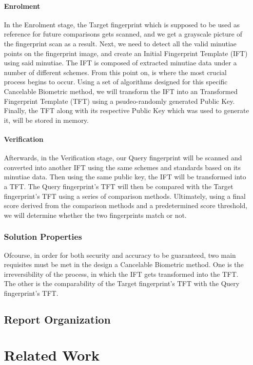 \documentclass[fyp]{socreport}
\begin{document}
\subsubsection{Enrolment}
In the Enrolment stage, the Target fingerprint which is supposed to be used as reference for future comparisons gets scanned, and we get a grayscale picture of the fingerprint scan as a result. Next, we need to detect all the valid minutiae points on the fingerprint image, and create an Initial Fingerprint Template (IFT) using said minutiae. The IFT is composed of extracted minutiae data under a number of different schemes. From this point on, is where the most crucial process begins to occur. Using a set of algorithms designed for this specific Cancelable Biometric method, we will transform the IFT into an Transformed Fingerprint Template (TFT) using a psudeo-randomly generated Public Key. Finally, the TFT along with its respective Public Key which was used to generate it, will be stored in memory.

\subsubsection{Verification}
Afterwards, in the Verification stage, our Query fingerprint will be scanned and converted into another IFT using the same schemes and standards based on its minutiae data. Then using the same public key, the IFT will be transformed into a TFT. The Query fingerprint's TFT will then be compared with the Target fingerprint's TFT using a series of comparison methods. Ultimately, using a final score derived from the comparison methods and a predetermined score threshold, we will determine whether the two fingerprints match or not.

\subsection{Solution Properties}
Ofcourse, in order for both security and accuracy to be guaranteed, two main requisites must be met in the design a Cancelable Biometric method. One is the irreversibility of the process, in which the IFT gets transformed into the TFT. The other is the comparability of the Target fingerprint's TFT with the Query fingerprint's TFT.
\section{Report Organization}

\chapter{Related Work}
\label{ch:related}
\end{document}
